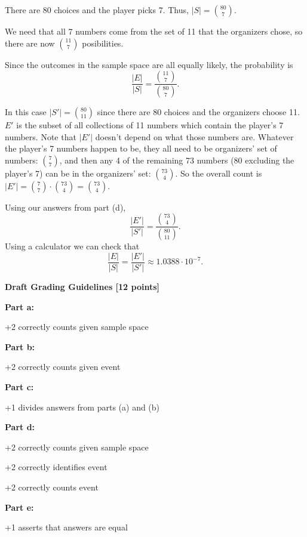 \documentclass[12pt]{exam}
\begin{document}
\begin{solution}
\begin{qparts}
    \item There are 80 choices and the player picks 7. Thus, $|S| = \binom{80}{7}.$
    \item We need that all 7 numbers come from the set of 11 that the organizers chose, so there are now $\binom{11}{7}$ posibilities.
    \item Since the outcomes in the sample space are all equally likely, the probability is
    $$\frac{|E|}{|S|} = \frac{\binom{11}{7}}{\binom{80}{7}}.$$
    \item In this case $|S'| = \binom{80}{11}$ since there are 80 choices and the organizers choose 11. $E'$ is the subset of all collections of 11 numbers which contain the player's 7 numbers. Note that $|E'|$ doesn't depend on what those numbers are. Whatever the player's 7 numbers happen to be, they all need to be organizers' set of numbers: $\binom 77$, and then any 4 of the remaining 73 numbers (80 excluding the player's 7) can be in the organizers' set: $\binom{73}{4}$. So the overall count is $|E'|=\binom 77\cdot\binom{73}{4}=\binom{73}{4}.$
    \item Using our answers from part (d),
    $$\frac{|E'|}{|S'|} = \frac{\binom{73}{4}}{\binom{80}{11}}.$$
    Using a calculator we can check that
    $$\frac{|E|}{|S|} = \frac{|E'|}{|S'|} \approx 1.0388\cdot 10^{-7}.$$
\end{qparts}

\smallskip
\textbf{Draft Grading Guidelines [12 points]}

\textbf{Part a:}
\begin{guidelines}
    \item +2 correctly counts given sample space
\end{guidelines}
\textbf{Part b:}
\begin{guidelines}
    \item +2 correctly counts given event
\end{guidelines}
\textbf{Part c:}
\begin{guidelines}
    \item +1 divides answers from parts (a) and (b)
\end{guidelines}
\textbf{Part d:}
\begin{guidelines}
    \item +2 correctly counts given sample space
    \item +2 correctly identifies event
    \item +2 correctly counts event
\end{guidelines}
\textbf{Part e:}
\begin{guidelines}
    \item +1 asserts that answers are equal
\end{guidelines}

\end{solution}
\end{document}
